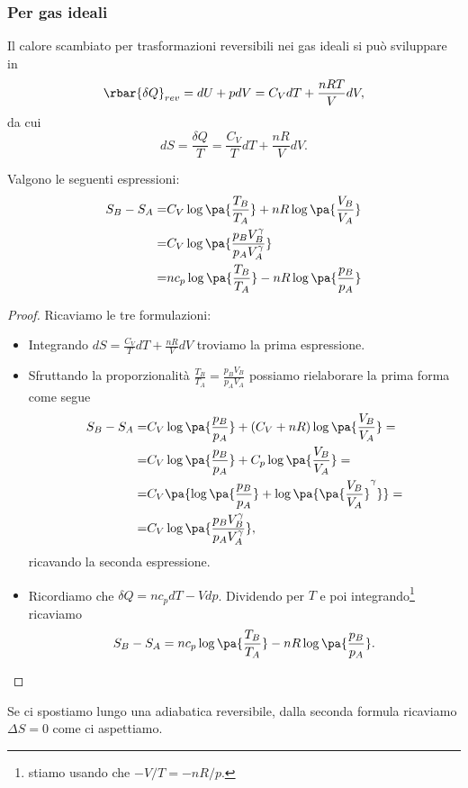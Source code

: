 \subsubsection{Per gas ideali}
Il calore scambiato per trasformazioni reversibili nei gas ideali si pu\`o sviluppare in
\[\rbar{\delta Q}_{rev}=dU+pdV=C_VdT+\frac{nRT}VdV,\]
da cui
\[dS=\frac{\delta Q}T=\frac{C_V}TdT+\frac{nR}VdV.\]
\begin{proposition}\label{EntropiaGasIdeali}
Valgono le seguenti espressioni:
\begin{align*}
S_B-S_A=&C_V\log\pa{\frac{T_B}{T_A}}+nR\log\pa{\frac{V_B}{V_A}}\\
=&C_V\log\pa{\frac{p_BV_B^\gamma}{p_AV_A^\gamma}}\\
=&nc_p\log\pa{\frac{T_B}{T_A}}-nR\log\pa{\frac{p_B}{p_A}}
\end{align*}
\end{proposition}
\begin{proof}
Ricaviamo le tre formulazioni:
\begin{itemize}
\item Integrando $dS=\frac{C_V}TdT+\frac{nR}VdV$ troviamo la prima espressione.
\item Sfruttando la proporzionalit\`a $\displaystyle \frac{T_B}{T_A}=\frac{p_BV_B}{p_AV_A}$ possiamo rielaborare la prima forma come segue
\begin{align*}
S_B-S_A=&C_V\log\pa{\frac{p_B}{p_A}}+(C_V+nR)\log\pa{\frac{V_B}{V_A}}=\\
=&C_V\log\pa{\frac{p_B}{p_A}}+C_p\log\pa{\frac{V_B}{V_A}}=\\
=&C_V\pa{\log\pa{\frac{p_B}{p_A}}+\log\pa{\pa{\frac{V_B}{V_A}}^\gamma}}=\\
=&C_V\log\pa{\frac{p_BV_B^\gamma}{p_AV_A^\gamma}},
\end{align*}
ricavando la seconda espressione.
\item Ricordiamo che $\delta Q=nc_p dT-Vdp$. Dividendo per $T$ e poi integrando\footnote{stiamo usando che $-V/T=-nR/p$.} ricaviamo
\[S_B-S_A=nc_p\log\pa{\frac{T_B}{T_A}}-nR\log\pa{\frac{p_B}{p_A}}.\]
\end{itemize}
\end{proof}


\begin{remark}
Se ci spostiamo lungo una adiabatica reversibile, dalla seconda formula ricaviamo $\Delta S=0$ come ci aspettiamo.
\end{remark}

